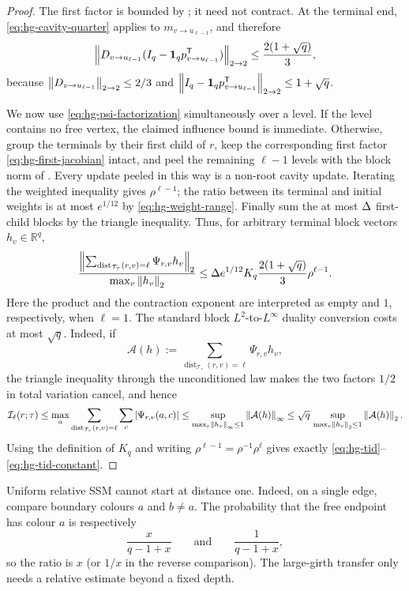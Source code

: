 \begin{proof}
The first factor is bounded by ; it need not
contract.  At the terminal end, \eqref{eq:hg-cavity-quarter} applies to
$m_{v\to u_{\ell-1}}$, and therefore
\begin{equation}
 \left\|D_{v\to u_{\ell-1}}
       (I_q-\mathbf1_qp_{v\to u_{\ell-1}}^{\mathsf T})\right\|_{2\to2}
 \le\frac{2(1+\sqrt q)}3,
 \label{eq:hg-terminal-bound}
\end{equation}
because $\left\|D_{v\to u_{\ell-1}}\right\|_{2\to2}\le2/3$ and
$\left\|I_q-\mathbf1_qp_{v\to u_{\ell-1}}^{\mathsf T}\right\|_{2\to2}\le1+\sqrt q$.

We now use \eqref{eq:hg-psi-factorization} simultaneously over a level.
If the level contains no free vertex, the claimed influence bound is
immediate.  Otherwise, group the terminals by their first child of $r$,
keep the corresponding
first factor \eqref{eq:hg-first-jacobian} intact, and peel the remaining
$\ell-1$ levels with the block norm of
.  Every update peeled in this way is a
non-root cavity update.  Iterating the weighted inequality gives
$\rho^{\ell-1}$; the ratio between its terminal and initial weights is at
most $e^{1/12}$ by \eqref{eq:hg-weight-range}.  Finally sum the at most
$\Delta$ first-child blocks by the triangle inequality.  Thus, for arbitrary
terminal block vectors $h_v\in\mathbb R^q$,
\[
 \frac{
  \left\|\sum_{\operatorname{dist}_{\mathcal T_\tau}(r,v)=\ell}
              \Psi_{r,v}h_v\right\|_2}
  {\max_v\left\|h_v\right\|_2}
 \le
 \Delta e^{1/12}K_q\frac{2(1+\sqrt q)}3\rho^{\ell-1}.
\]
Here the product and the contraction exponent are interpreted as empty and
$1$, respectively, when $\ell=1$.  The standard block
$L^2$-to-$L^\infty$ duality conversion costs at most $\sqrt q$.  Indeed, if
\[
 \mathcal A(h):=
 \sum_{\operatorname{dist}_{\mathcal T_\tau}(r,v)=\ell}
       \Psi_{r,v}h_v ,
\]
the triangle
inequality through the unconditioned law makes the two factors \(1/2\) in
total variation cancel, and hence
\[
 \mathcal I_\ell(r;\tau)
 \le \max_a
       \sum_{\operatorname{dist}_{\mathcal T_\tau}(r,v)=\ell}\sum_c
       \left|\Psi_{r,v}(a,c)\right|
 \le
 \sup_{\max_v\left\|h_v\right\|_\infty\le1}\left\|\mathcal A(h)\right\|_\infty
 \le
 \sqrt q\,
 \sup_{\max_v\left\|h_v\right\|_2\le1}\left\|\mathcal A(h)\right\|_2 .
\]
Using the definition of $K_q$ and writing
$\rho^{\ell-1}=\rho^{-1}\rho^\ell$ gives exactly
\eqref{eq:hg-tid}--\eqref{eq:hg-tid-constant}.
\end{proof}

Uniform relative SSM cannot start at distance one. Indeed, on a single
edge, compare boundary colours \(a\) and \(b\ne a\).  The probability that
the free endpoint has colour \(a\) is respectively
\[
  \frac{x}{q-1+x}
  \qquad\text{and}\qquad
  \frac1{q-1+x},
\]
so the ratio is \(x\) (or \(1/x\) in the reverse comparison).  The
large-girth transfer only needs a relative estimate beyond a fixed depth.

